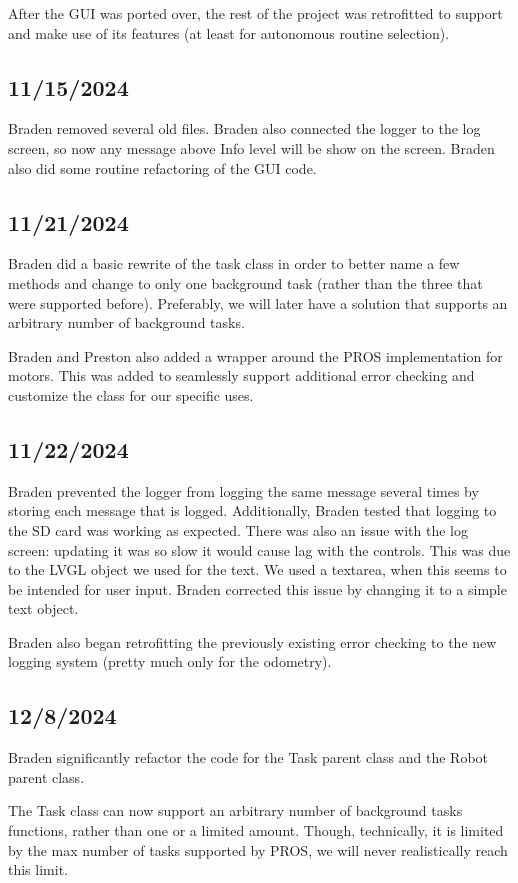 After the GUI was ported over, the rest of the project was retrofitted to support and make use of its features (at least for autonomous routine selection). 

\subsection{11/15/2024}
Braden removed several old files. Braden also connected the logger to the log screen, so now any message above Info level will be show on the screen. Braden also did some routine refactoring of the GUI code. 

\subsection{11/21/2024}
Braden did a basic rewrite of the task class in order to better name a few methods and change to only one background task (rather than the three that were supported before). Preferably, we will later have a solution that supports an arbitrary number of background tasks. 

Braden and Preston also added a wrapper around the PROS implementation for motors. This was added to seamlessly support additional error checking and customize the class for our specific uses. 

\subsection{11/22/2024}
Braden prevented the logger from logging the same message several times by storing each message that is logged. Additionally, Braden tested that logging to the SD card was working as expected. There was also an issue with the log screen: updating it was so slow it would cause lag with the controls. This was due to the LVGL object we used for the text. We used a textarea, when this seems to be intended for user input. Braden corrected this issue by changing it to a simple text object. 

Braden also began retrofitting the previously existing error checking to the new logging system (pretty much only for the odometry). 

\subsection{12/8/2024}
Braden significantly refactor the code for the Task parent class and the Robot parent class. 

The Task class can now support an arbitrary number of background tasks functions, rather than one or a limited amount. Though, technically, it is limited by the max number of tasks supported by PROS, we will never realistically reach this limit. 

